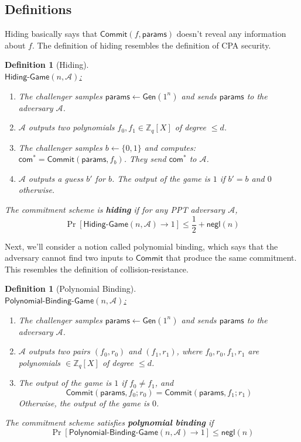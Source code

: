 \documentclass[11pt]{article}
\newcommand{\Gen}{\mathsf{Gen}}
\newcommand{\Commit}{\mathsf{Commit}}
\newcommand{\A}{\mathcal{A}}
\newcommand{\ZZ}{\mathbb{Z}}
\newcommand{\negl}{\mathsf{negl}}
\newcommand{\bin}{\{0,1\}}
\newcommand{\bit}{\bin}
\newtheorem{definition}[theorem]{Definition}
\numberwithin{equation}{section}
\begin{document}
\subsection{Definitions}\label{sec:hiding-and-polynomial-binding}
Hiding basically says that $\Commit(f, \mathsf{params})$ doesn't reveal any information about $f$. The definition of hiding resembles the definition of CPA security.
\begin{definition}[Hiding]
$ $\\

\noindent\underline{$\mathsf{Hiding\text{-}Game}(n, \A)$:}
\begin{enumerate}
    \item The challenger samples $\mathsf{params} \leftarrow \Gen(1^n)$ and sends $\mathsf{params}$ to the adversary $\A$.
    \item $\A$ outputs two polynomials $f_0, f_1 \in \ZZ_q[X]$ of degree $\leq d$.
    \item The challenger samples $b \leftarrow \bit$ and computes:
    $\mathsf{com}^* = \Commit(\mathsf{params}, f_b)$. They send $\mathsf{com}^*$ to $\A$.
    \item $\A$ outputs a guess $b'$ for $b$. The output of the game is $1$ if $b' = b$ and $0$ otherwise.
\end{enumerate}

The commitment scheme is \textbf{hiding} if for any PPT adversary $\A$,
\[\Pr[\mathsf{Hiding\text{-}Game}(n, \A) \to 1] \leq \frac{1}{2} + \negl(n)\]
\end{definition}

Next, we'll consider a notion called polynomial binding, which says that the adversary cannot find two inputs to $\Commit$ that produce the same commitment.  This resembles the definition of collision-resistance.
\begin{definition}[Polynomial Binding]
$ $\\

\noindent\underline{$\mathsf{Polynomial\text{-}Binding\text{-}Game}(n, \A)$:}
\begin{enumerate}
    \item The challenger samples $\mathsf{params} \leftarrow \Gen(1^n)$ and sends $\mathsf{params}$ to the adversary $\A$.
    \item $\A$ outputs two pairs $(f_0, r_0)$ and $(f_1, r_1)$, where $f_0, r_0, f_1, r_1$ are polynomials $\in \ZZ_q[X]$ of degree $\leq d$.
    \item The output of the game is $1$ if $f_0 \neq f_1$, and
    \[\Commit(\mathsf{params}, f_0; r_0) = \Commit(\mathsf{params}, f_1; r_1)\]
    Otherwise, the output of the game is $0$.
\end{enumerate}
The commitment scheme satisfies \textbf{polynomial binding} if 
\[\Pr[\mathsf{Polynomial\text{-}Binding\text{-}Game}(n, \A) \to 1] \leq \negl(n)\]
\end{definition}
\end{document}
